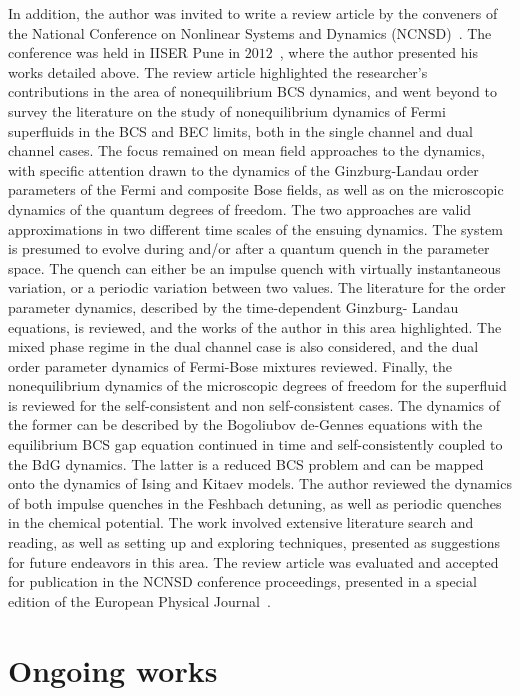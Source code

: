 \documentclass[a4paper,10pt]{report}
\begin{document}
In addition, the author was invited to write a review article by the conveners of the National Conference on Nonlinear Systems and Dynamics (NCNSD)~\cite{ncnsd}. The conference was held in IISER Pune in $2012$~\cite{ncnsd}, where the author presented his works detailed above. The review article highlighted the researcher's contributions in the area of nonequilibrium BCS dynamics, and went beyond  to survey the literature on the study of nonequilibrium dynamics of Fermi  superfluids in the BCS and BEC limits, both in the single channel and dual channel cases. The focus remained on mean field approaches to the dynamics, with specific attention drawn to the dynamics of the Ginzburg-Landau order parameters of the Fermi and composite Bose fields, as well as on the microscopic dynamics of the quantum degrees of freedom. The two  approaches are valid approximations in two different time scales of the ensuing dynamics. The system is presumed to evolve during and/or after a quantum quench in the parameter space. The quench can either be an impulse quench with virtually instantaneous variation, or a periodic variation between two values. The literature for the order parameter dynamics, described by the time-dependent Ginzburg- Landau equations, is reviewed, and the works of the author in this area highlighted. The mixed phase regime in the dual channel case is also considered, and the dual order parameter dynamics of Fermi-Bose mixtures reviewed. Finally, the nonequilibrium dynamics of the microscopic degrees of freedom for the superfluid is reviewed for the self-consistent and non self-consistent cases. The dynamics of the former can be described by the Bogoliubov de-Gennes equations with the equilibrium BCS gap equation continued in time and self-consistently coupled to the BdG dynamics. The latter is a reduced BCS problem and can be mapped onto the dynamics of Ising and Kitaev models. The author reviewed the dynamics of both impulse quenches in the Feshbach detuning, as well as periodic quenches in the chemical potential. The work involved extensive literature search and reading, as well as setting up and exploring techniques, presented as suggestions for future endeavors in this area. The review article was evaluated and accepted for publication in the NCNSD conference proceedings, presented in a special edition of the European Physical Journal~\cite{myreview}.

\section{\sc Ongoing works}
\label{sec:ongoing}
\end{document}

